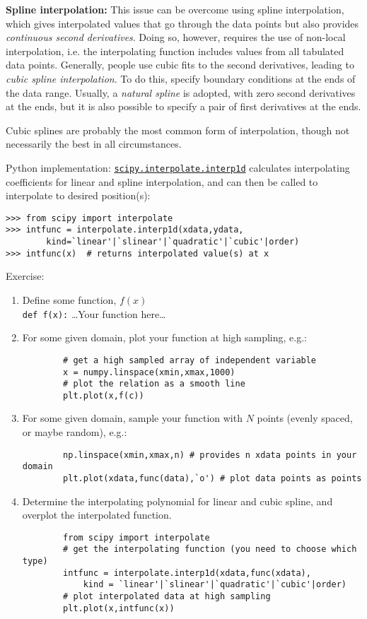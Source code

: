 \documentclass{article}
\begin{document}
{\bf Spline interpolation:}
This issue can be overcome using spline interpolation, which
gives interpolated values that go through the data points but also
provides \emph{continuous second derivatives}. Doing so, however, requires
the use of non-local interpolation, i.e. the interpolating function
includes values from all tabulated data points.  Generally, people use
cubic fits to the second derivatives, leading to \emph{cubic spline
interpolation}. To do this, specify boundary conditions at the ends of
the data range. Usually, a \emph{natural spline} is adopted, with zero
second derivatives at the ends, but it is also possible to specify a
pair of first derivatives at the ends.

Cubic splines are probably the most common form of interpolation,
though not necessarily the best in all circumstances.

Python implementation:
\href{http://docs.scipy.org/doc/scipy/reference/generated/scipy.interpolate.interp1d.html#scipy.interpolate.interp1d}
{\tt scipy.interpolate.interp1d} calculates
interpolating coefficients for linear and spline interpolation, and can then
be called to interpolate to desired position(s):
\begin{verbatim}
>>> from scipy import interpolate
>>> intfunc = interpolate.interp1d(xdata,ydata,
        kind=`linear'|`slinear'|`quadratic'|`cubic'|order)
>>> intfunc(x)  # returns interpolated value(s) at x
\end{verbatim}

Exercise:
\begin{enumerate}
    \item Define some function, $f(x)$\\
        \verb|def f(x):|
            \ldots Your function here\ldots
    \item For some given domain, plot your function at high sampling, e.g.:
        \begin{verbatim}
        # get a high sampled array of independent variable
        x = numpy.linspace(xmin,xmax,1000)
        # plot the relation as a smooth line
        plt.plot(x,f(c))
        \end{verbatim}
    \item For some given domain, sample your function with $N$ points
        (evenly spaced, or maybe random), e.g.:
        \begin{verbatim}
        np.linspace(xmin,xmax,n) # provides n xdata points in your domain
        plt.plot(xdata,func(data),`o') # plot data points as points
        \end{verbatim}
    \item Determine the interpolating polynomial for linear and cubic
        spline, and overplot the interpolated function.
        \begin{verbatim}
        from scipy import interpolate
        # get the interpolating function (you need to choose which type)
        intfunc = interpolate.interp1d(xdata,func(xdata),
            kind = `linear'|`slinear'|`quadratic'|`cubic'|order)
        # plot interpolated data at high sampling
        plt.plot(x,intfunc(x))
        \end{verbatim}
\end{enumerate}
\end{document}
